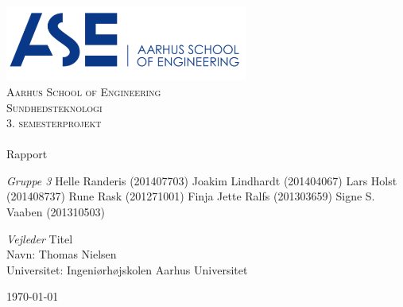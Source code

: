 \begin{titlingpage}
\begin{center}

~ \\[3cm]

\includegraphics[width=0.6\textwidth]{figurer/ASE}~\\[1cm]

\textsc{\LARGE Aarhus School of Engineering}\\[1.5cm]

\textsc{\Large Sundhedsteknologi}\\
\textsc{\Large 3. semesterprojekt}\\[0.5cm]

\noindent\makebox[\linewidth]{\rule{\textwidth}{0.4pt}}\\
[0.5cm]{\Huge Rapport}
\noindent\makebox[\linewidth]{\rule{\textwidth}{0.4pt}}

\end{center}

\textit{Gruppe 3} \newline
Helle Randeris (201407703) \newline
Joakim Lindhardt (201404067) \newline
Lars Holst (201408737) \newline
Rune Rask (201271001) \newline		 
Finja Jette Ralfs (201303659) \newline
Signe S. Vaaben (201310503)  


\textit{Vejleder} \newline
Titel\\
Navn: Thomas Nielsen\\
Universitet: Ingeniørhøjskolen Aarhus Universitet


\vfill

\begin{center}
{\large \today}
\end{center}


\end{titlingpage}